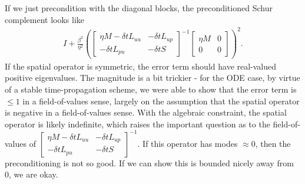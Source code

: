 \documentclass[a4paper,10pt]{article}
\begin{document}
%
If we just precondition with the diagonal blocks, the preconditioned 
Schur complement looks like
%
\begin{align*}
I + \frac{\beta^2}{\eta^2} \left(\begin{bmatrix} \eta M - \delta tL_{uu} & -\delta tL_{up} \\
		-\delta tL_{pu} & -\delta tS \end{bmatrix}^{-1}
	\begin{bmatrix} \eta M & 0 \\ 0 & 0 \end{bmatrix} \right)^2.
\end{align*}
%
If the spatial operator is symmetric, the error term should have real-valued
positive eigenvalues. The magnitude is a bit trickier - for the ODE case,
by virtue of a stable time-propagation scheme, we were able to show that
the error term is $\leq 1$ in a field-of-values sense, largely on the
assumption that the spatial operator is negative in a field-of-values
sense. With the algebraic constraint, the spatial operator is likely
indefinite, which raises the important question as to the field-of-values
of $\begin{bmatrix} \eta M - \delta tL_{uu} & -\delta tL_{up} \\
-\delta tL_{pu} & -\delta tS \end{bmatrix}^{-1}$. If this operator
has modes $\approx 0$, then the preconditioning is not so good. If we
can show this is bounded nicely away from 0, we are okay.
\end{document}
